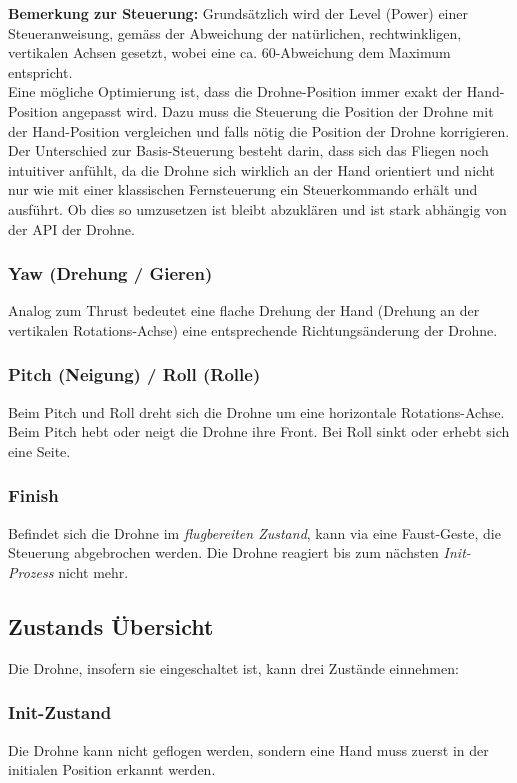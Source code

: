 \textbf{Bemerkung zur Steuerung:} Grundsätzlich wird der Level (Power) einer Steueranweisung, gemäss der Abweichung der natürlichen, rechtwinkligen, vertikalen Achsen gesetzt, wobei eine ca. 60\textdegree-Abweichung dem Maximum entspricht.\\
Eine mögliche Optimierung ist, dass die Drohne-Position immer exakt der Hand-Position angepasst wird.
Dazu muss die Steuerung die Position der Drohne mit der Hand-Position vergleichen und falls nötig die Position der Drohne korrigieren.
Der Unterschied zur Basis-Steuerung besteht darin, dass sich das Fliegen noch intuitiver anfühlt, da die Drohne sich wirklich an der Hand orientiert und nicht nur wie mit einer klassischen Fernsteuerung ein Steuerkommando erhält und ausführt.
Ob dies so umzusetzen ist bleibt abzuklären und ist stark abhängig von der API der Drohne.

\subsubsection{Yaw (Drehung / Gieren)}
Analog zum Thrust bedeutet eine flache Drehung der Hand (Drehung an der vertikalen Rotations-Achse) eine entsprechende Richtungsänderung der Drohne.

\subsubsection{Pitch (Neigung) / Roll (Rolle)}
Beim Pitch und Roll dreht sich die Drohne um eine horizontale Rotations-Achse. Beim Pitch hebt oder neigt die Drohne ihre Front. Bei Roll sinkt oder erhebt sich eine Seite.

\subsubsection{Finish}
Befindet sich die Drohne im \textit{flugbereiten Zustand}, kann via eine Faust-Geste, die Steuerung abgebrochen werden.
Die Drohne reagiert bis zum nächsten \textit{Init-Prozess} nicht mehr.


\subsection{Zustands Übersicht}
Die Drohne, insofern sie eingeschaltet ist, kann drei Zustände einnehmen:

\subsubsection{Init-Zustand}
Die Drohne kann nicht geflogen werden, sondern eine Hand muss zuerst in der initialen Position erkannt werden.

